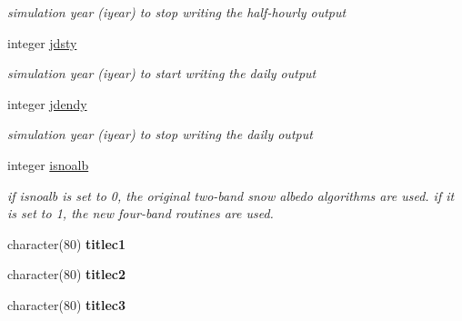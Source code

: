 \begin{DoxyCompactItemize}
\begin{DoxyCompactList}\small\item\em simulation year (iyear) to stop writing the half-\/hourly output \end{DoxyCompactList}\item 
\hypertarget{structctem__statevars_1_1ctem__switches_a16fe9160d12b1a6ca3ca697502afcb38}{}integer \hyperlink{structctem__statevars_1_1ctem__switches_a16fe9160d12b1a6ca3ca697502afcb38}{jdsty}\label{structctem__statevars_1_1ctem__switches_a16fe9160d12b1a6ca3ca697502afcb38}

\begin{DoxyCompactList}\small\item\em simulation year (iyear) to start writing the daily output \end{DoxyCompactList}\item 
\hypertarget{structctem__statevars_1_1ctem__switches_a882547c5f8e222cace89c88c62947738}{}integer \hyperlink{structctem__statevars_1_1ctem__switches_a882547c5f8e222cace89c88c62947738}{jdendy}\label{structctem__statevars_1_1ctem__switches_a882547c5f8e222cace89c88c62947738}

\begin{DoxyCompactList}\small\item\em simulation year (iyear) to stop writing the daily output \end{DoxyCompactList}\item 
\hypertarget{structctem__statevars_1_1ctem__switches_a3539dafb72ad7482814c4b59bcb55762}{}integer \hyperlink{structctem__statevars_1_1ctem__switches_a3539dafb72ad7482814c4b59bcb55762}{isnoalb}\label{structctem__statevars_1_1ctem__switches_a3539dafb72ad7482814c4b59bcb55762}

\begin{DoxyCompactList}\small\item\em if isnoalb is set to 0, the original two-\/band snow albedo algorithms are used. if it is set to 1, the new four-\/band routines are used. \end{DoxyCompactList}\item 
\hypertarget{structctem__statevars_1_1ctem__switches_a4feb503a6f958c0f89f9162fcccc32c7}{}character(80) {\bfseries titlec1}\label{structctem__statevars_1_1ctem__switches_a4feb503a6f958c0f89f9162fcccc32c7}

\item 
\hypertarget{structctem__statevars_1_1ctem__switches_aed3b1557dad2e616fe2349b39e7e7abd}{}character(80) {\bfseries titlec2}\label{structctem__statevars_1_1ctem__switches_aed3b1557dad2e616fe2349b39e7e7abd}

\item 
\hypertarget{structctem__statevars_1_1ctem__switches_a6a2c0c4c8b178c50ee3529251121e6d0}{}character(80) {\bfseries titlec3}\label{structctem__statevars_1_1ctem__switches_a6a2c0c4c8b178c50ee3529251121e6d0}

\end{DoxyCompactItemize}


